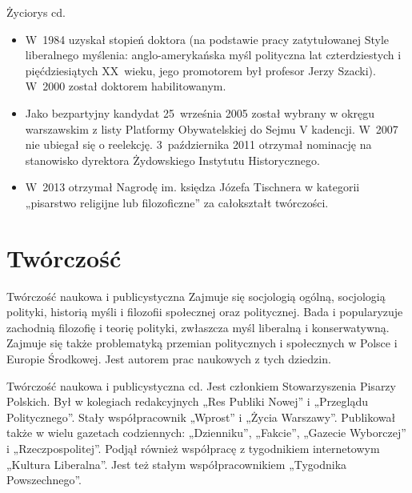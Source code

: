 \documentclass{beamer}
\begin{document}
\begin{frame}{Życiorys cd.}
\begin {itemize}
\item<1> W~1984 uzyskał stopień doktora (na podstawie pracy zatytułowanej Style liberalnego myślenia: anglo-amerykańska myśl polityczna lat czterdziestych i pięćdziesiątych XX~wieku, jego promotorem był profesor Jerzy Szacki). W~2000 został doktorem habilitowanym.
\pause
\item<2> Jako bezpartyjny kandydat 25~września 2005 został wybrany w okręgu warszawskim z listy Platformy Obywatelskiej do Sejmu V kadencji. W~2007 nie ubiegał się o reelekcję.
3~października 2011 otrzymał nominację na stanowisko dyrektora Żydowskiego Instytutu Historycznego.
\item<3> W~2013 otrzymał Nagrodę im. księdza Józefa Tischnera w kategorii „pisarstwo religijne lub filozoficzne” za całokształt twórczości.
\end {itemize}
\end {frame}

\section{Twórczość}
\begin{frame}{Twórczość naukowa i publicystyczna}
Zajmuje się socjologią ogólną, socjologią polityki, historią myśli i filozofii społecznej oraz politycznej. Bada i popularyzuje zachodnią filozofię i teorię polityki, zwłaszcza myśl liberalną i konserwatywną. Zajmuje się także problematyką przemian politycznych i społecznych w Polsce i Europie Środkowej. Jest autorem prac naukowych z tych dziedzin.
\end {frame}

\begin{frame}{Twórczość naukowa i publicystyczna cd.}
Jest członkiem Stowarzyszenia Pisarzy Polskich. Był w kolegiach redakcyjnych „Res Publiki Nowej” i „Przeglądu Politycznego”. Stały współpracownik „Wprost” i „Życia Warszawy”. Publikował także w wielu gazetach codziennych: „Dzienniku”, „Fakcie”, „Gazecie Wyborczej” i „Rzeczpospolitej”. Podjął również współpracę z tygodnikiem internetowym „Kultura Liberalna”. Jest też stałym współpracownikiem „Tygodnika Powszechnego”.
\end {frame}
\end{document}

